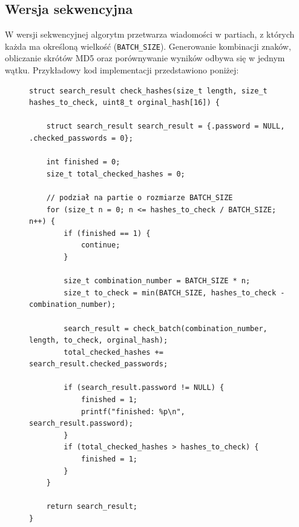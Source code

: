 \documentclass[a4paper,12pt]{article}
\begin{document}
\newpage

\subsection{Wersja sekwencyjna}
W wersji sekwencyjnej algorytm przetwarza wiadomości w partiach, z których każda ma określoną wielkość (\texttt{BATCH\_SIZE}). Generowanie kombinacji znaków, obliczanie skrótów MD5 oraz porównywanie wyników odbywa się w jednym wątku. Przykładowy kod implementacji przedstawiono poniżej:
\begin{figure}[H]
\begin{lstlisting}
struct search_result check_hashes(size_t length, size_t hashes_to_check, uint8_t orginal_hash[16]) {

    struct search_result search_result = {.password = NULL, .checked_passwords = 0};

    int finished = 0;
    size_t total_checked_hashes = 0;

    // podział na partie o rozmiarze BATCH_SIZE
    for (size_t n = 0; n <= hashes_to_check / BATCH_SIZE; n++) {
        if (finished == 1) {
            continue;
        }

        size_t combination_number = BATCH_SIZE * n;
        size_t to_check = min(BATCH_SIZE, hashes_to_check - combination_number);

        search_result = check_batch(combination_number, length, to_check, orginal_hash);
        total_checked_hashes += search_result.checked_passwords;

        if (search_result.password != NULL) {
            finished = 1;
            printf("finished: %p\n", search_result.password);
        }
        if (total_checked_hashes > hashes_to_check) {
            finished = 1;
        }
    }

    return search_result;
}
\end{lstlisting}
\end{figure}


\newpage
\end{document}
